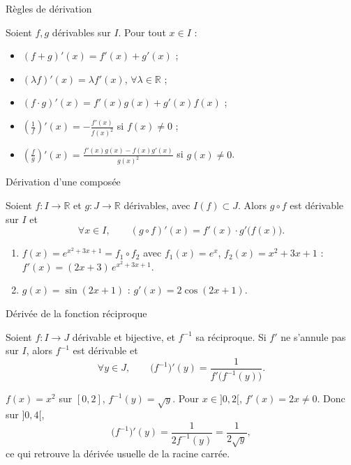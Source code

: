 \documentclass[aspectratio=169,11pt]{beamer}
\newcommand{\R}{\mathbb{R}}
\newcommand{\fonc}[3]{#1\colon #2\to #3}
\begin{document}
\begin{frame}{Règles de dérivation}
	\begin{definitionbox}[Propriétés]
		\small
		Soient $f,g$ dérivables sur $I$. Pour tout $x\in I$ :
		\begin{itemize}
			\item $(f+g)'(x)=f'(x)+g'(x)$ ;
			\item $(\lambda f)'(x)=\lambda f'(x)$, $\forall\lambda\in\R$ ;
			\item $(f\cdot g)'(x)=f'(x)g(x)+g'(x)f(x)$ ;
			\item $\displaystyle\left(\frac{1}{f}\right)'(x)=-\frac{f'(x)}{f(x)^2}$ si $f(x)\neq 0$ ;
			\item $\displaystyle\left(\frac{f}{g}\right)'(x)=\frac{f'(x)g(x)-f(x)g'(x)}{g(x)^2}$ si $g(x)\neq 0$.
		\end{itemize}
	\end{definitionbox}
\end{frame}

\begin{frame}{Dérivation d'une composée}
	\begin{definitionbox}[Proposition]
		Soient $\fonc{f}{I}{\R}$ et $\fonc{g}{J}{\R}$ dérivables, avec $I(f)\subset J$.
		Alors $g\circ f$ est dérivable sur $I$ et
		\[
			\forall x\in I, \qquad (g\circ f)'(x)=f'(x)\cdot g'\bigl(f(x)\bigr).
		\]
	\end{definitionbox}
	\vspace{0.15cm}
	\begin{exemplebox}
		\begin{enumerate}
			\item $f(x)=e^{x^2+3x+1}=f_1\circ f_2$ avec $f_1(x)=e^x$, $f_2(x)=x^2+3x+1$ :
			$f'(x)=(2x+3)\,e^{x^2+3x+1}$.
			\item $g(x)=\sin(2x+1)$ : $g'(x)=2\cos(2x+1)$.
		\end{enumerate}
	\end{exemplebox}
\end{frame}

\begin{frame}[shrink=8]{Dérivée de la fonction réciproque}
	\begin{definitionbox}[Corollaire]
		Soient $\fonc{f}{I}{J}$ dérivable et bijective, et $f^{-1}$ sa réciproque.
		Si $f'$ ne s'annule pas sur $I$, alors $f^{-1}$ est dérivable et
		\[
			\forall y\in J, \qquad \bigl(f^{-1}\bigr)'(y)=\frac{1}{f'\bigl(f^{-1}(y)\bigr)}.
		\]
	\end{definitionbox}
	\vspace{0.08cm}
	\begin{exemplebox}
		$f(x)=x^2$ sur $[0,2]$, $f^{-1}(y)=\sqrt{y}$. Pour $x\in]0,2[$, $f'(x)=2x\neq 0$.
		Donc sur $]0,4[$,
		\[
			\bigl(f^{-1}\bigr)'(y)=\frac{1}{2f^{-1}(y)}=\frac{1}{2\sqrt{y}},
		\]
		ce qui retrouve la dérivée usuelle de la racine carrée.
	\end{exemplebox}
\end{frame}
\end{document}

